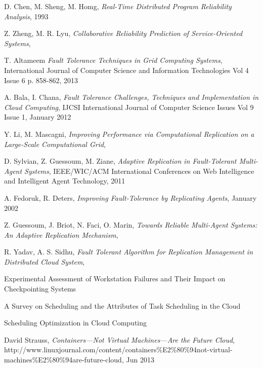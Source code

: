 \documentclass{cslthse-msc}
\begin{document}
\begin{thebibliography}{50}
	D. Chen, M. Sheng, M. Homg,
	\emph{Real-Time Distributed Program Reliability Analysis},
	1993

	Z. Zheng, M. R. Lyu,
	\emph{Collaborative Reliability Prediction of Service-Oriented Systems},

	T. Altameem
	\emph{Fault Tolerance Techniques in Grid Computing Systems},
	International Journal of Computer Science and Information Technologies Vol 4 Issue 6 p. 858-862,
	2013

	A. Bala, I. Chana,
	\emph{Fault Tolerance Challenges, Techniques and Implementation in Cloud Computing},
	IJCSI International Journal of Computer Science Issues Vol 9 Issue 1,
	January 2012

	Y. Li, M. Mascagni,
	\emph{Improving Performance via Computational Replication on a Large-Scale Computational Grid},

	D. Sylvian, Z. Guessoum, M. Ziane,
	\emph{Adaptive Replication in Fault-Tolerant Multi-Agent Systems},
	IEEE/WIC/ACM International Conferences on Web Intelligence and Intelligent Agent Technology,
	2011

	A. Fedoruk, R. Deters,
	\emph{Improving Fault-Tolerance by Replicating Agents},
	January 2002

	Z. Guessoum, J. Briot, N. Faci, O. Marin,
	\emph{Towards Reliable Multi-Agent Systems: An Adaptive Replication Mechanism},

	R. Yadav, A. S. Sidhu,
	\emph{Fault Tolerant Algorithm for Replication Management in Distributed Cloud System},
	

Experimental Assessment of Workstation Failures and Their Impact on Checkpointing Systems

A Survey on Scheduling and the Attributes of Task Scheduling in the Cloud

Scheduling Optimization in Cloud Computing

	David Strauss,
	\emph{Containers—Not Virtual Machines—Are the Future Cloud},
	http://www.linuxjournal.com/content/containers\%E2\%80\%94not-virtual-machines\%E2\%80\%94are-future-cloud,
	Jun 2013
	

\end{thebibliography}
\end{document}
